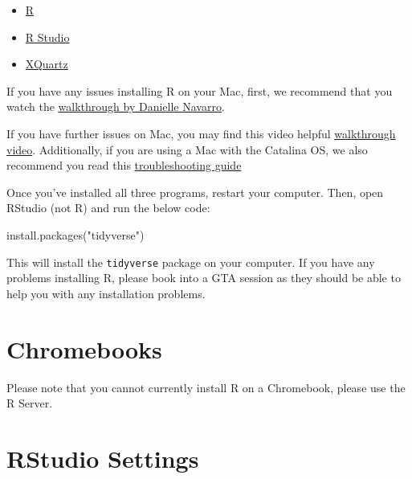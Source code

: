 \documentclass[
  oneside]{book}
\newenvironment{Shaded}{\begin{snugshade}}{\end{snugshade}}
\newcommand{\FunctionTok}[1]{\textcolor[rgb]{0.00,0.00,0.00}{#1}}
\newcommand{\NormalTok}[1]{#1}
\newcommand{\StringTok}[1]{\textcolor[rgb]{0.31,0.60,0.02}{#1}}
\providecommand{\tightlist}{%
  \setlength{\itemsep}{0pt}\setlength{\parskip}{0pt}}
\begin{document}
\begin{itemize}
\tightlist
\item
  \href{https://www.stats.bris.ac.uk/R/}{R}\\
\item
  \href{https://rstudio.com/products/rstudio/download/\#download}{R Studio}\\
\item
  \href{https://www.xquartz.org/}{XQuartz}
\end{itemize}

If you have any issues installing R on your Mac, first, we recommend that you watch the \href{https://www.youtube.com/watch?v=ay25o485YXs\&list=PLRPB0ZzEYegOZivdelOuEn-R-XUN-DOjd\&index=1\&t=113s}{walkthrough by Danielle Navarro}.

If you have further issues on Mac, you may find this video helpful \href{https://www.youtube.com/watch?v=90IdULVGmYY}{walkthrough video}. Additionally, if you are using a Mac with the Catalina OS, we also recommend you read this \href{https://psyteachr.github.io/FAQ/installing-r-and-rstudio.html\#i-am-using-macos-10.15-catalina}{troubleshooting guide}

Once you've installed all three programs, restart your computer. Then, open RStudio (not R) and run the below code:

\begin{Shaded}
\begin{Highlighting}[]
\FunctionTok{install.packages}\NormalTok{(}\StringTok{"tidyverse"}\NormalTok{)}
\end{Highlighting}
\end{Shaded}

This will install the \texttt{tidyverse} package on your computer. If you have any problems installing R, please book into a GTA session as they should be able to help you with any installation problems.

\hypertarget{chromebooks}{%
\section{Chromebooks}\label{chromebooks}}

Please note that you cannot currently install R on a Chromebook, please use the R Server.

\hypertarget{rstudio-settings}{%
\section{RStudio Settings}\label{rstudio-settings}}
\end{document}

